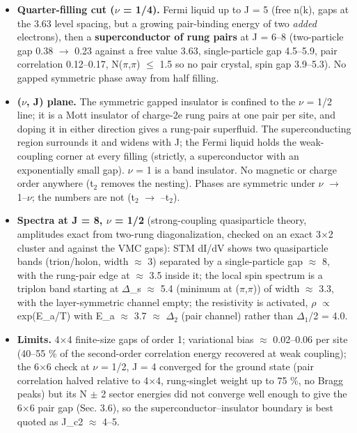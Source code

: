 \documentclass[10pt]{article}
\begin{document}
\begin{itemize}
the second-order strong-coupling estimate (rung-pair gap closes at J $\approx$ 4.9); the FL $\to$ SC boundary with the
BCS estimate of where the interlayer pairing gap exceeds the level spacing.
\item \textbf{Quarter-filling cut ($\nu$ = 1/4).} Fermi liquid up to J = 5 (free n(k), gaps at the 3.63 level spacing, but a
growing pair-binding energy of two \emph{added} electrons), then a \textbf{superconductor of rung pairs} at J = 6--8
(two-particle gap 0.38 $\to$ 0.23 against a free value 3.63, single-particle gap 4.5--5.9, pair correlation 0.12--0.17,
N($\pi$,$\pi$) $\le$ 1.5 so no pair crystal, spin gap 3.9--5.3). No gapped symmetric phase away from half filling.
\item \textbf{($\nu$, J) plane.} The symmetric gapped insulator is confined to the $\nu$ = 1/2 line; it is a Mott insulator of
charge-2e rung pairs at one pair per site, and doping it in either direction gives a rung-pair superfluid. The
superconducting region surrounds it and widens with J; the Fermi liquid holds the weak-coupling corner at every
filling (strictly, a superconductor with an exponentially small gap). $\nu$ = 1 is a band insulator. No magnetic or
charge order anywhere (t$_2$ removes the nesting). Phases are symmetric under $\nu$ $\to$ 1--$\nu$; the numbers are not
(t$_2$ $\to$ --t$_2$).
\item \textbf{Spectra at J = 8, $\nu$ = 1/2} (strong-coupling quasiparticle theory, amplitudes exact from two-rung
diagonalization, checked on an exact 3$\times$2 cluster and against the VMC gaps): STM dI/dV shows two quasiparticle
bands (trion/holon, width $\approx$ 3) separated by a single-particle gap $\approx$ 8, with the rung-pair edge at $\approx$ 3.5 inside
it; the local spin spectrum is a triplon band starting at $\Delta$\_s $\approx$ 5.4 (minimum at ($\pi$,$\pi$)) of width $\approx$ 3.3, with the
layer-symmetric channel empty; the resistivity is activated, $\rho$ $\propto$ exp(E\_a/T) with E\_a $\approx$ 3.7 $\approx$ $\Delta$$_2$ (pair channel)
rather than $\Delta$$_1$/2 = 4.0.
\item \textbf{Limits.} 4$\times$4 finite-size gaps of order 1; variational bias $\approx$ 0.02--0.06 per site (40--55 \% of the
second-order correlation energy recovered at weak coupling); the 6$\times$6 check at $\nu$ = 1/2, J = 4 converged for
the ground state (pair correlation halved relative to 4$\times$4, rung-singlet weight up to 75 \%, no Bragg peaks) but
its N $\pm$ 2 sector energies did not converge well enough to give the 6$\times$6 pair gap (Sec. 3.6), so the
superconductor--insulator boundary is best quoted as J\_c2 $\approx$ 4--5.
\end{itemize}
\end{document}
